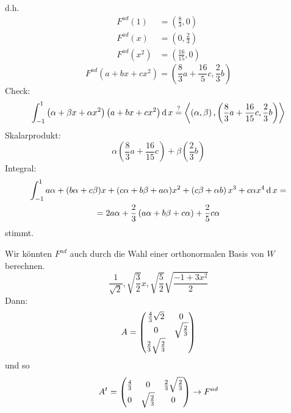 \begin{Bsp}
  d.h.
  \begin{align*}
    F^{ad}(1)&=\left( \frac{8}{3},0 \right)\\
    F^{ad}(x)&=\left( 0,\frac{2}{3} \right)\\
    F^{ad}(x^2)&=\left( \frac{16}{15},0 \right)
  \end{align*}
  \[F^{ad}\left( a+bx+cx^2 \right)=\left( \frac{8}{3}a+\frac{16}{5}c,\frac{2}{3}b \right)\]
  Check:
  \[\int^1_{-1}\left( \alpha+\beta x+\alpha x^2 \right)\left( a+bx+cx^2 \right)\operatorname{d} x \stackrel{?}{=} \left\langle \left( \alpha,\beta \right),\left( \frac{8}{3}a+\frac{16}{15}c,\frac{2}{3}b \right) \right\rangle \]
  Skalarprodukt:
  \[\alpha\left( \frac{8}{3}a+\frac{16}{15}c \right)+\beta\left( \frac{2}{3}b \right)\]
  Integral:
  \begin{gather*}
    \int^1_{-1}a\alpha+(b\alpha+c\beta)x+(c\alpha+b\beta+a\alpha)x^2+\left( c\beta+\alpha b \right)x^3+c\alpha x^4\operatorname{d} x=\\
    =2a\alpha+\frac{2}{3}\left( a\alpha+b\beta+c\alpha \right)+\frac{2}{5}c\alpha
  \end{gather*}
  stimmt.
\end{Bsp}
\begin{Bem}
  Wir könnten $F^{ad}$ auch durch die Wahl einer orthonormalen Basis von $W$ berechnen.
  \[\frac{1}{\sqrt{2}},\sqrt{\frac{3}{2}}x,\sqrt{\frac{5}{2}}\sqrt{\frac{-1+3x^2}{2}}\]
  Dann:
  \[A=\begin{pmatrix}\frac{4}{3}\sqrt{2}&0\\0&\sqrt{\frac{2}{3}}\\\frac{2}{3}\sqrt{\frac{2}{3}}\end{pmatrix}\]
  und so
  \[A^t=\begin{pmatrix}\frac{4}{3}&0&\frac{2}{3}\sqrt{\frac{2}{3}}\\0&\sqrt{\frac{2}{3}}&0\end{pmatrix}\to F^{ad}\]
\end{Bem}
